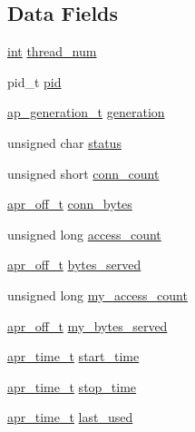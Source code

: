 \subsection*{Data Fields}
\begin{DoxyCompactItemize}
\item 
\hyperlink{pcre_8txt_a42dfa4ff673c82d8efe7144098fbc198}{int} \hyperlink{structworker__score_a51e7bad1b12a4ea7f1d2115a9ba13ac4}{thread\+\_\+num}
\item 
pid\+\_\+t \hyperlink{structworker__score_a1521c2d66e6fec93b7616e55bd101ce4}{pid}
\item 
\hyperlink{scoreboard_8h_a36af569e52dd926cc530df071af3d939}{ap\+\_\+generation\+\_\+t} \hyperlink{structworker__score_aa4c92865d3f0016902bc5a4bf00d0ee6}{generation}
\item 
unsigned char \hyperlink{structworker__score_a00d08351762a2d7d79cfde18a95956fa}{status}
\item 
unsigned short \hyperlink{structworker__score_a486c7cbbe2b3fbf89c04dc17000e88c5}{conn\+\_\+count}
\item 
\hyperlink{group__apr__platform_ga6938af9075cec15c88299109381aa984}{apr\+\_\+off\+\_\+t} \hyperlink{structworker__score_a792c1a9d0058a1b6908f25340b4a6d09}{conn\+\_\+bytes}
\item 
unsigned long \hyperlink{structworker__score_a5ecd56707dd31f7dfa8b287db7dc0196}{access\+\_\+count}
\item 
\hyperlink{group__apr__platform_ga6938af9075cec15c88299109381aa984}{apr\+\_\+off\+\_\+t} \hyperlink{structworker__score_aaf705b3f798f1471daba811228464337}{bytes\+\_\+served}
\item 
unsigned long \hyperlink{structworker__score_a35f6773d2511411b86d37d2f6ebc34fe}{my\+\_\+access\+\_\+count}
\item 
\hyperlink{group__apr__platform_ga6938af9075cec15c88299109381aa984}{apr\+\_\+off\+\_\+t} \hyperlink{structworker__score_a3cdfdda861cb6b2a347c90a2631631b5}{my\+\_\+bytes\+\_\+served}
\item 
\hyperlink{group__apr__time_gadb4bde16055748190eae190c55aa02bb}{apr\+\_\+time\+\_\+t} \hyperlink{structworker__score_a8f0704677e897148d1b0d2aa68aa18b4}{start\+\_\+time}
\item 
\hyperlink{group__apr__time_gadb4bde16055748190eae190c55aa02bb}{apr\+\_\+time\+\_\+t} \hyperlink{structworker__score_a8b6c244411031439ffb57e6fea8b87ee}{stop\+\_\+time}
\item 
\hyperlink{group__apr__time_gadb4bde16055748190eae190c55aa02bb}{apr\+\_\+time\+\_\+t} \hyperlink{structworker__score_ae09dbc02b9613a719962bdb4290e2bed}{last\+\_\+used}

\end{DoxyCompactItemize}
